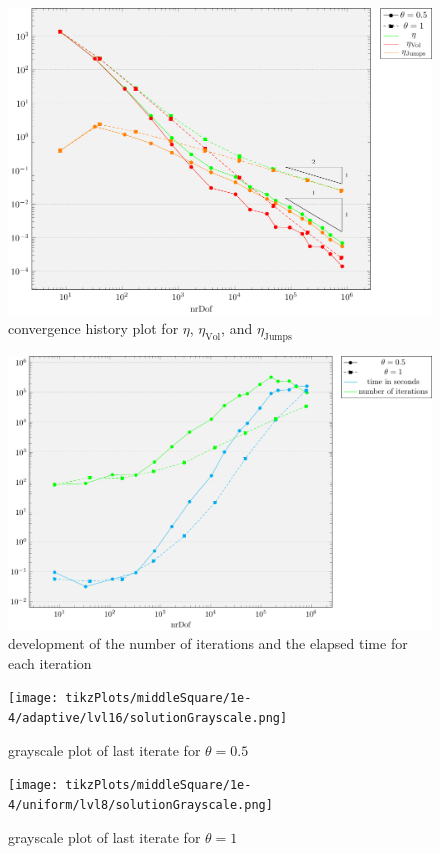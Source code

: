 \documentclass[draft=false,twoside,12pt]{scrreprt}
\begin{document}
\begin{figure}[H]
	\centering
	\includegraphics[width=14cm]
  {tikzPlots/middleSquare/convergence.pdf}
  \caption{convergence history plot for $\eta$,
  $\eta_\text{Vol}$, and $\eta_\text{Jumps}$}
\end{figure}

\begin{figure}[H]
	\centering
	\includegraphics[width=14cm]{tikzPlots/middleSquare/misc.pdf}
  \caption{development of the number of iterations and the elapsed time for 
  each iteration}
\end{figure}

\begin{minipage}[t]{0.5\textwidth}
  \begin{figure}[H]
	  \centering
		\texttt{[image: tikzPlots/middleSquare/1e-4/adaptive/lvl16/solutionGrayscale.png]}
    \caption{grayscale plot of last iterate for $\theta = 0.5$}
  \end{figure}
\end{minipage}
\begin{minipage}[t]{0.5\textwidth}
  \begin{figure}[H]
	  \centering
		\texttt{[image: tikzPlots/middleSquare/1e-4/uniform/lvl8/solutionGrayscale.png]}
    \caption{grayscale plot of last iterate for $\theta = 1$}
  \end{figure}
\end{minipage}
\end{document}
